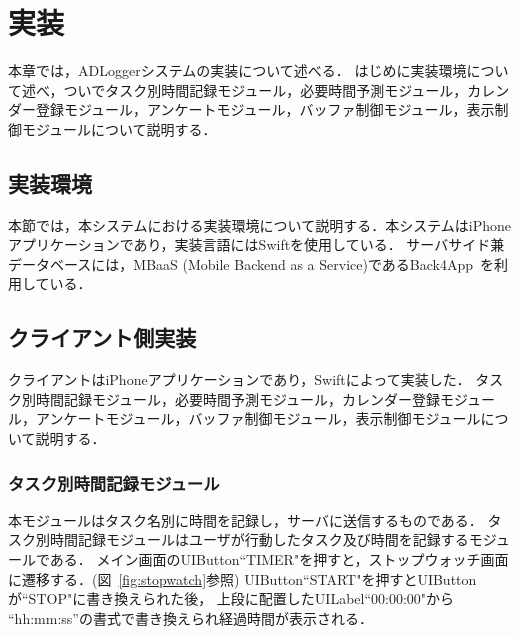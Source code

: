 \chapter{実装}
本章では，ADLoggerシステムの実装について述べる．
はじめに実装環境について述べ，ついでタスク別時間記録モジュール，必要時間予測モジュール，カレンダー登録モジュール，アンケートモジュール，バッファ制御モジュール，表示制御モジュールについて説明する．

\section{実装環境}
本節では，本システムにおける実装環境について説明する．本システムはiPhoneアプリケーションであり，実装言語にはSwiftを使用している．
サーバサイド兼データベースには，MBaaS (Mobile Backend as a Service)であるBack4App~\cite{back4app}を利用している．

\section{クライアント側実装}
クライアントはiPhoneアプリケーションであり，Swiftによって実装した．
タスク別時間記録モジュール，必要時間予測モジュール，カレンダー登録モジュール，アンケートモジュール，バッファ制御モジュール，表示制御モジュールについて説明する．

\subsection{タスク別時間記録モジュール}
本モジュールはタスク名別に時間を記録し，サーバに送信するものである．
タスク別時間記録モジュールはユーザが行動したタスク及び時間を記録するモジュールである．
メイン画面のUIButton``TIMER"を押すと，ストップウォッチ画面に遷移する．(図~\ref{fig:stopwatch}参照)
UIButton``START"を押すとUIButtonが``STOP"に書き換えられた後，
上段に配置したUILabel``00:00:00"から “hh:mm:ss”の書式で書き換えられ経過時間が表示される．

